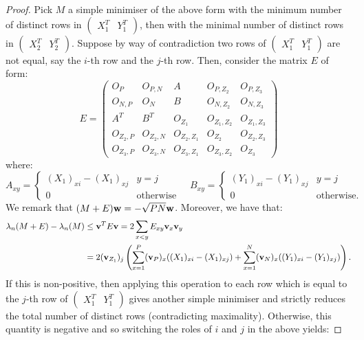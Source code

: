 \documentclass[12pt]{article}
\begin{document}
\begin{proof}
Pick $M$ a simple minimiser of the above form with the minimum number of distinct rows in $\begin{pmatrix} X_1^T & Y_1^T\end{pmatrix}$, then with the minimal number of distinct rows in $\begin{pmatrix} X_2^T & Y_2^T\end{pmatrix}$. Suppose by way of contradiction two rows of $\begin{pmatrix}X_1^T & Y_1^T\end{pmatrix}$ are not equal, say the $i$-th row and the $j$-th row. Then, consider the matrix $E$ of form:
    \begin{equation*}
        E = \begin{pmatrix}
            O_{P} & O_{P,N} & A & O_{P,Z_2} & O_{P,Z_3} \\ O_{N,P} & O_{N} & B & O_{N,Z_2} & O_{N,Z_3}\\ A^T & B^T & O_{Z_1} & O_{Z_1,Z_2} & O_{Z_1,Z_3} \\ O_{Z_2,P} & O_{Z_2,N} & O_{Z_2,Z_1} & O_{Z_2}  & O_{Z_2,Z_3} \\ O_{Z_3,P} & O_{Z_3,N} & O_{Z_3,Z_1} & O_{Z_3,Z_2} & O_{Z_3}
        \end{pmatrix}
    \end{equation*}
    where:
    \begin{equation*}
        A_{xy} = \begin{cases} (X_1)_{xi} - (X_1)_{xj} & y=j \\ 0 & \text{otherwise}\end{cases} \quad B_{xy} = \begin{cases} (Y_1)_{xi} - (Y_1)_{xj} & y=j \\ 0 & \text{otherwise.}\end{cases}
    \end{equation*}
    We remark that $(M+E)\bold{w} = -\sqrt{PN}\bold{w}$. Moreover, we have that:
    \begin{alignat*}{1}
        \lambda_{n}(M+E) - \lambda_{n}(M) & \le \bold{v}^{T} E\bold{v} = 2\sum_{x<y}  E_{xy}\bold{v}_x\bold{v}_y  \\ 
        & = 2(\bold{v}_{Z_1})_j\left(\sum_{x=1}^{P} (\bold{v}_P)_x ((X_1)_{xi} - (X_1)_{xj}) + \sum_{x=1}^{N} (\bold{v}_N)_x ((Y_1)_{xi} - (Y_1)_{xj})\right).
    \end{alignat*}
    If this is non-positive, then applying this operation to each row which is equal to the $j$-th row of $\begin{pmatrix}X_1^T&Y_1^T\end{pmatrix}$ gives another simple minimiser and strictly reduces the total number of distinct rows (contradicting maximality). Otherwise, this quantity is negative and so switching the roles of $i$ and $j$ in the above yields:

\end{proof}
\end{document}

